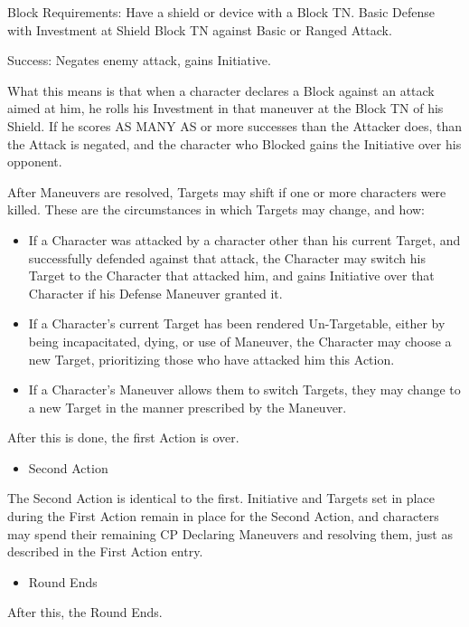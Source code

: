 \documentclass[oneside,11pt,english]{book}
\begin{document}
 

Block 
Requirements: Have a shield or device with a Block TN. 
Basic Defense with Investment at Shield Block TN against Basic or Ranged Attack. 


Success: Negates enemy attack, gains Initiative. 

 

What this means is that when a character declares a Block against an attack aimed at him, he rolls 
his Investment in that maneuver at the Block TN of his Shield. If he scores AS MANY AS or 
more successes than the Attacker does, than the Attack is negated, and the character who Blocked 
gains the Initiative over his opponent. 

 

After Maneuvers are resolved, Targets may shift if one or more characters were killed. These are 
the circumstances in which Targets may change, and how: 

 
\begin{itemize}
\item If a Character was attacked by a character other than his current Target, and successfully 
defended against that attack, the Character may switch his Target to the Character that 
attacked him, and gains Initiative over that Character if his Defense Maneuver granted it. 
\item If a Character’s current Target has been rendered Un-Targetable, either by being 
incapacitated, dying, or use of Maneuver, the Character may choose a new Target, 
prioritizing those who have attacked him this Action. 
\item If a Character’s Maneuver allows them to switch Targets, they may change to a new 
Target in the manner prescribed by the Maneuver. 
\end{itemize}
 

After this is done, the first Action is over. 

 
\begin{itemize}
\item Second Action
\end{itemize} 
The Second Action is identical to the first. Initiative and Targets set in place during the First 
Action remain in place for the Second Action, and characters may spend their remaining CP 
Declaring Maneuvers and resolving them, just as described in the First Action entry. 

 
\begin{itemize}
\item Round Ends 
\end{itemize}
After this, the Round Ends. 
\end{document}
